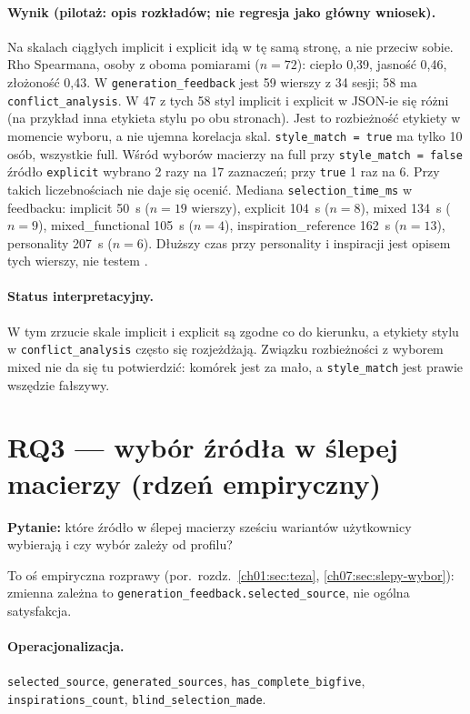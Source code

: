 \paragraph{Wynik (pilotaż: opis rozkładów; nie regresja jako główny wniosek).}
Na skalach ciągłych implicit i explicit idą w tę samą stronę, a nie przeciw sobie. Rho Spearmana, osoby z oboma pomiarami ($n=72$): ciepło 0,39, jasność 0,46, złożoność 0,43.
W \texttt{generation\_feedback} jest 59 wierszy z 34 sesji; 58 ma \texttt{conflict\_analysis}. W 47 z tych 58 styl implicit i explicit w JSON-ie się różni (na przykład inna etykieta stylu po obu stronach). Jest to rozbieżność etykiety w momencie wyboru, a nie ujemna korelacja skal.
\texttt{style\_match = true} ma tylko 10 osób, wszystkie full. Wśród wyborów macierzy na full przy \texttt{style\_match = false} źródło \texttt{explicit} wybrano 2 razy na 17 zaznaczeń; przy \texttt{true} 1 raz na 6. Przy takich liczebnościach  nie daje się ocenić.
Mediana \texttt{selection\_time\_ms} w feedbacku: implicit 50~s ($n=19$ wierszy), explicit 104~s ($n=8$), mixed 134~s ($n=9$), mixed\_functional 105~s ($n=4$), inspiration\_reference 162~s ($n=13$), personality 207~s ($n=6$). Dłuższy czas przy personality i inspiracji jest opisem tych wierszy, nie testem .

\paragraph{Status interpretacyjny.}
W tym zrzucie skale implicit i explicit są zgodne co do kierunku, a etykiety stylu w \texttt{conflict\_analysis} często się rozjeżdżają. Związku rozbieżności z wyborem mixed nie da się tu potwierdzić: komórek jest za mało, a \texttt{style\_match} jest prawie wszędzie fałszywy.

\section{RQ3 --- wybór źródła w ślepej macierzy (rdzeń empiryczny)}
\label{ch08:sec:rq3}
\label{ch08:sec:macierz}

\textbf{Pytanie:} które źródło w ślepej macierzy sześciu wariantów użytkownicy wybierają i czy wybór zależy od profilu?

To oś empiryczna rozprawy (por.\ rozdz.~\ref{ch01:sec:teza}, \ref{ch07:sec:slepy-wybor}): zmienna zależna to \texttt{generation\_feedback.selected\_source}, nie ogólna satysfakcja.

\paragraph{Operacjonalizacja.}
\texttt{selected\_source}, \texttt{generated\_sources}, \texttt{has\_complete\_bigfive}, \texttt{inspirations\_count}, \texttt{blind\_selection\_made}.

